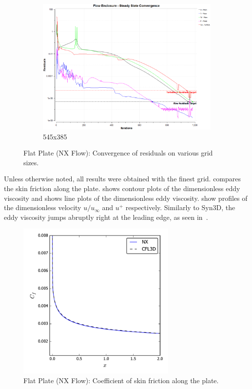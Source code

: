 \begin{figure}[ht!]
\begin{subfigure}{0.48\textwidth}
        \includegraphics[width=\textwidth]{./figs/flatnx/545x385_conv.png}
        \caption{545x385}
    \end{subfigure}
    \caption{Flat Plate (NX Flow): Convergence of residuals on various grid sizes.}
    \label{fig:nxflatcnvstudy}
\end{figure}

Unless otherwise noted, all results were obtained with the finest grid.  compares the skin friction along the plate.  shows contour plots of the dimensionless eddy viscosity and  shows line plots of the dimensionless eddy viscosity.  show profiles of the dimensionless velocity $u/u_\infty$ and $u^+$ respectively. Similarly to Syn3D, the eddy viscosity jumps abruptly right at the leading edge, as seen in~.
\begin{figure}[ht!]
\centering
	\includegraphics[width=0.7\textwidth]{figs/flatnx/cf.pdf}
    \caption{Flat Plate (NX Flow): Coefficient of skin friction along the plate.}
    \label{fig:nxflatcf}
\end{figure}

